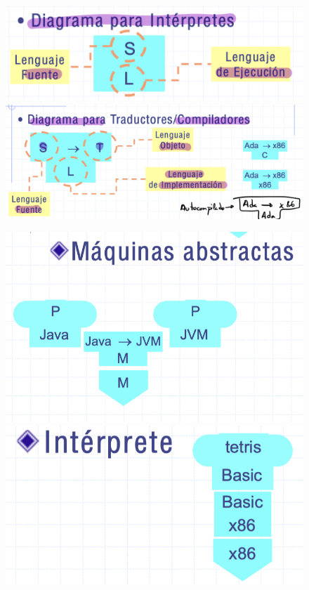 \documentclass[12pt]{report} %
\begin{document}
\begin{figure}[H]
	{\includegraphics[scale=.2]{Untitled 18.png}
	\includegraphics[scale=.13]{Untitled 19.png}}
\end{figure}

\begin{figure}[H]
	{\includegraphics[scale=.2]{Untitled 20.png}
	\includegraphics[scale=.2]{Untitled 21.png}}
\end{figure}
\end{document}
